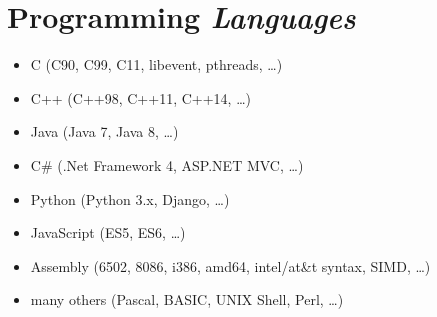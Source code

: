 \documentclass[a4paper,10pt]{article}
\begin{document}
\section*{{\color{green}P}rogramming \emph{Languages}}
\begin{itemize}
	\item C (C90, C99, C11, libevent, pthreads, \ldots)
	\item C++ (C++98, C++11, C++14, \ldots)
	\item Java (Java 7, Java 8, \ldots)
	\item C\# (.Net Framework 4, ASP.NET MVC, \ldots)
	\item Python (Python 3.x, Django, \ldots)
	\item JavaScript (ES5, ES6, \ldots)
	\item Assembly (6502, 8086, i386, amd64, intel/at\&t syntax,
	    SIMD, \ldots)
	\item many others (Pascal, BASIC, UNIX Shell, Perl, \ldots)
\end{itemize}
\end{document}
